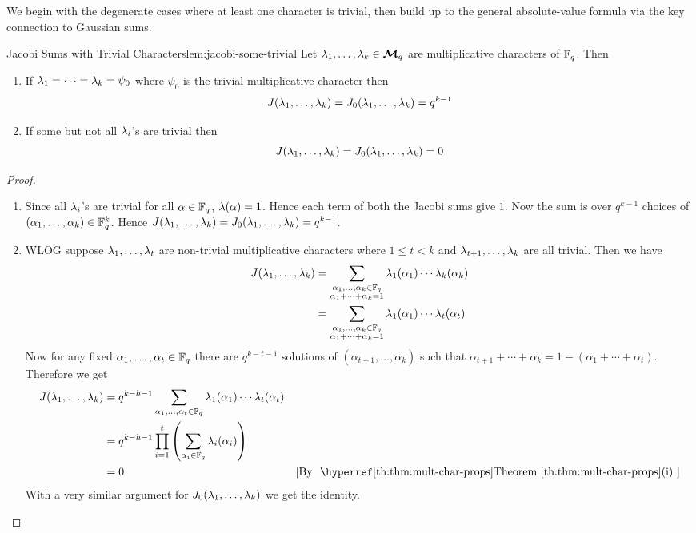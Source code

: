 We begin with the degenerate cases where at least one character is trivial, then build up to the general absolute-value formula via the key connection to Gaussian sums.
\begin{lemma}{Jacobi Sums with Trivial Characters}{lem:jacobi-some-trivial}
%
Let $\lambda_1,\dots, \lambda_k\in\boldsymbol{\mathcal{M}}_q$ are multiplicative characters of $\mathbb{F}_q$. Then\begin{enumerate}[label=(\roman*)]
  \item If $\lambda_1=\cdots=\lambda_k=\psi_0$ where $\psi_0$ is the trivial multiplicative character then $$J(\lambda_1,\dots, \lambda_k)=J_0(\lambda_1,\dots, \lambda_k)=q^{k-1}$$
  \item If some but not all $\lambda_i$'s are trivial then $$J(\lambda_1,\dots, \lambda_k)=J_0(\lambda_1,\dots, \lambda_k)=0$$
\end{enumerate}
\end{lemma}
\begin{proof}
  \begin{enumerate}[label=(\roman*)]
    \item Since all $\lambda_i$'s are trivial for all $\alpha\in\mathbb{F}_q$, $\lambda(\alpha)=1$. Hence each term of both the Jacobi sums give $1$. Now the sum is over $q^{k-1}$ choices of $(\alpha_1,\dots, \alpha_k)\in\mathbb{F}_q^k$. Hence $J(\lambda_1,\dots, \lambda_k)=J_0(\lambda_1,\dots, \lambda_k)=q^{k-1}$. 
    \item WLOG suppose $\lambda_1,\dots, \lambda_t$ are non-trivial multiplicative characters where $1\leq t<k$ and $\lambda_{t+1},\dots, \lambda_k$ are all trivial. Then we have \begin{align*}
      J(\lambda_1,\dots, \lambda_k)& = \sum_{\substack{\alpha_1,\dots,\alpha_k\in\mathbb{F}_q\\ \alpha_1+\cdots+\alpha_k=1}} \lambda_1(\alpha_1)\cdots\lambda_k(\alpha_k)\\ 
      & = \sum_{\substack{\alpha_1,\dots,\alpha_k\in\mathbb{F}_q\\ \alpha_1+\cdots+\alpha_k=1}}\lambda_1(\alpha_1)\cdots \lambda_t(\alpha_t)
    \end{align*}
    Now for any fixed $\alpha_1,\dots, \alpha_t\in\mathbb{F}_q$ there are $q^{k-t-1}$ solutions of $(\alpha_{t+1},\dots, \alpha_k)$ such that $\alpha_{t+1}+\cdots+\alpha_k=1-(\alpha_1+\cdots+\alpha_t)$. Therefore we get \begin{align*}
      J(\lm_1,\dots,\lm_k) & = q^{k-h-1}\sum_{\alpha_1,\dots,\alpha_t\in\bbF_q}\lm_1(\alpha_1)\cdots \lm_t(\alpha_t)\\ 
      & = q^{k-h-1}\prod_{i=1}^t \lt(\sum_{\alpha_i\in\bbF_q}\lm_i(\alpha_i)\rt)\\ 
      & = 0 \byt[(i)]{mult-char-props}
    \end{align*}With a very similar argument for $J_0(\lambda_1,\dots,\lambda_k)$ we get the identity. 
  \end{enumerate}
\end{proof}

